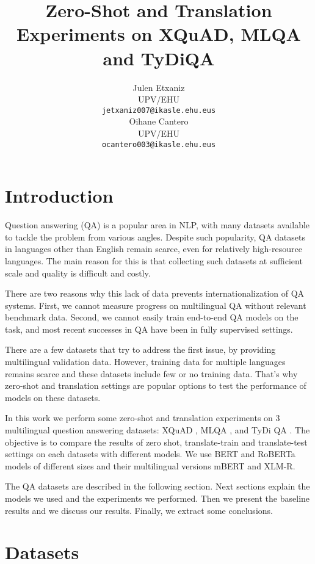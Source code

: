 \documentclass[11pt]{article}
\title{Zero-Shot and Translation Experiments on XQuAD, MLQA and TyDiQA}
\author{Julen Etxaniz \\
  UPV/EHU \\
  \texttt{jetxaniz007@ikasle.ehu.eus} \\\And
  Oihane Cantero \\
  UPV/EHU \\
  \texttt{ocantero003@ikasle.ehu.eus}}
\begin{document}
\maketitle
\begin{abstract}
\end{abstract}

\section{Introduction}

Question answering (QA) is a popular area in NLP, with many datasets available to tackle the problem from various angles. Despite such popularity, QA datasets in languages other than English remain scarce, even for relatively high-resource languages. The main reason for this is that collecting such datasets at sufficient scale and quality is difficult and costly.

There are two reasons why this lack of data prevents internationalization of QA systems. First, we cannot measure progress on multilingual QA without relevant benchmark data. Second, we cannot easily train end-to-end QA models on the task, and most recent successes in QA have been in fully supervised settings.

There are a few datasets that try to address the first issue, by providing multilingual validation data. However, training data for multiple languages remains scarce and these datasets include few or no training data. That's why zero-shot and translation settings are popular options to test the performance of models on these datasets.

In this work we perform some zero-shot and translation experiments on 3 multilingual question answering datasets: XQuAD \cite{Artetxe:etal:2019}, MLQA \cite{lewis2019mlqa}, and TyDi QA \cite{tydiqa}. The objective is to compare the results of zero shot, translate-train and translate-test settings on each datasets with different models. We use BERT and RoBERTa models of different sizes and their multilingual versions mBERT and XLM-R.

The QA datasets are described in the following section. Next sections explain the models we used and the experiments we performed. Then we present the baseline results and we discuss our results. Finally, we extract some conclusions.

\section{Datasets}
\end{document}
